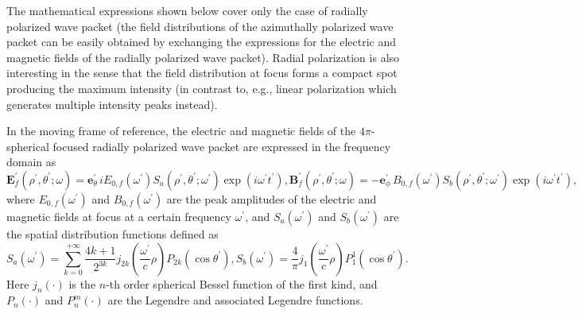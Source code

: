 \documentclass[10pt, a4paper, twoside, openright]{report}
\renewcommand{\vec}[1]{\mathbf{#1}}
\begin{document}
The mathematical expressions shown below cover only the case of radially polarized wave packet (the field distributions of the azimuthally polarized wave packet can be easily obtained by exchanging the expressions for the electric and magnetic fields of the radially polarized wave packet). Radial polarization is also interesting in the sense that the field distribution at focus forms a compact spot producing the maximum intensity (in contrast to, e.g., linear polarization which generates multiple intensity peaks instead).

In the moving frame of reference, the electric and magnetic fields of the $ 4 \pi $-spherical focused radially polarized wave packet are expressed in the frequency domain as
\begin{subequations}
\begin{equation}\label{key}
\vec{E}^{\prime}_{f} \left( \rho^{\prime}, \theta^{\prime}; \omega \right) = \vec{e}_{\theta}^{\prime} \, i E_{0, f} \left( \omega^{\prime} \right) S_a \left( \rho^{\prime}, \theta^{\prime}; \omega^{\prime} \right) \exp \left(i \omega^{\prime} t^{\prime} \right),
\end{equation}
\begin{equation}\label{key}
\vec{B}^{\prime}_{f} \left( \rho^{\prime}, \theta^{\prime}; \omega \right) = - \vec{e}_{\phi}^{\prime} \, B_{0, f} \left( \omega^{\prime} \right) S_b \left( \rho^{\prime}, \theta^{\prime}; \omega^{\prime} \right) \exp \left(i \omega^{\prime} t^{\prime} \right),
\end{equation}
\end{subequations}
where $ E_{0, f} \left( \omega^{\prime} \right) $ and $ B_{0, f} \left( \omega^{\prime} \right) $ are the peak amplitudes of the electric and magnetic fields at focus at a certain frequency $ \omega^{\prime} $, and $ S_a \left( \omega^{\prime} \right) $ and $ S_b \left( \omega^{\prime} \right) $ are the spatial distribution functions defined as
\begin{subequations}
	\begin{equation}\label{key}
S_a \left( \omega^{\prime} \right) = \sum_{k = 0}^{+\infty} \frac{4k + 1}{2^{3k}} j_{2k} \left( \frac{\omega^{\prime}}{c} \rho \right) P_{2k} \left( \cos \theta^{\prime} \right),
	\end{equation}
	\begin{equation}\label{key}
S_b \left( \omega^{\prime} \right) = \frac{4}{\pi} j_1 \left( \frac{\omega^{\prime}}{c} \rho \right) P^1_1 \left( \cos \theta^{\prime} \right).
	\end{equation}
\end{subequations}
Here $ j_{n} \left( \cdot \right) $ is the $ n $-th order spherical Bessel function of the first kind, and $ P_n \left( \cdot \right) $ and $ P^m_n \left( \cdot \right) $ are the Legendre and associated Legendre functions.
\end{document}
